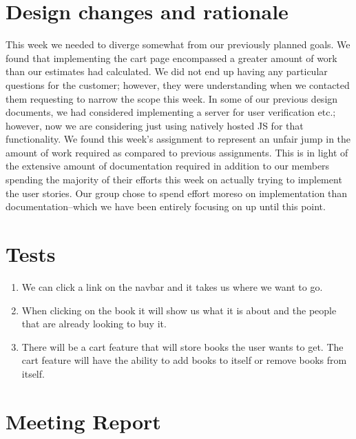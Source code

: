 \documentclass[12pt]{article}
\begin{document}
	\section{Design changes and rationale}
		This week we needed to diverge somewhat from our previously planned goals. 
		We found that implementing the cart page encompassed a greater amount of work than our estimates had calculated. 
		We did not end up having any particular questions for the customer; however, they were understanding when we contacted them requesting to narrow the scope this week. 
		In some of our previous design documents, we had considered implementing a server for user verification etc.; however, now we are considering just using natively hosted JS for that functionality. 
		We found this week’s assignment to represent an unfair jump in the amount of work required as compared to previous assignments. 
		This is in light of the extensive amount of documentation required in addition to our members spending the majority of their efforts this week on actually trying to implement the user stories. 
		Our group chose to spend effort moreso on implementation than documentation--which we have been entirely focusing on up until this point.


	\section{Tests}

		\begin{enumerate}
		\item We can click a link on the navbar and it takes us where we want to go.

		\item When clicking on the book it will show us what it is about and the people that are already looking to buy it.

		\item There will be a cart feature that will store books the user wants to get.  The cart feature will have the ability to add books to itself or remove books from itself.
		\end{enumerate}


	\section{Meeting Report}
\end{document}
